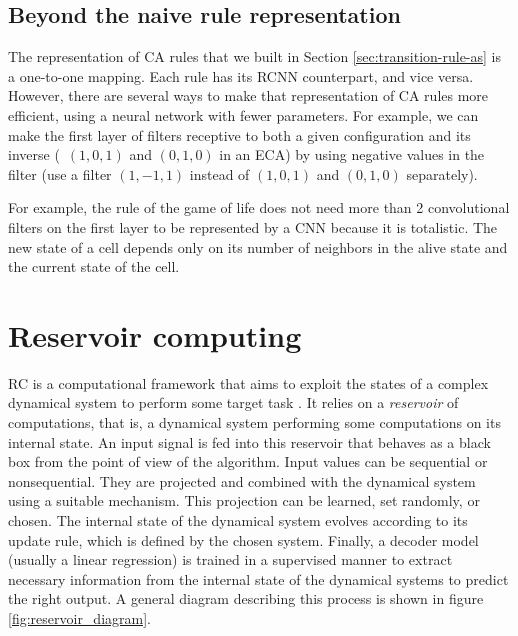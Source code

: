 \subsection{Beyond the naive rule representation}

The representation of \ac{CA} rules that we built in Section
\ref{sec:transition-rule-as} is a one-to-one mapping. Each rule has its
R\ac{CNN} counterpart, and vice versa. However, there are several ways to make
that representation of \ac{CA} rules more efficient, using a neural network with
fewer parameters. For example, we can make the first layer of filters receptive
to both a given configuration and its inverse (\eg~$(1, 0, 1)$ and $(0, 1, 0)$
in an \acl{ECA}) by using negative values in the filter (use a filter $(1, -1, 1)$
instead of $(1, 0, 1)$ and $(0, 1, 0)$ separately).

For example, the rule of the game of life does not need more than 2 convolutional
filters on the first layer to be represented by a \ac{CNN} because it is
totalistic. The new state of a cell depends only on its number of neighbors in
the alive state and the current state of the cell.


\section{Reservoir computing \label{sec:res-models}}
\Acf{RC} is a computational framework that aims to exploit the states of a
complex dynamical system to perform some target task
\parencite{tanakaRecentAdvancesPhysical2019}. It relies on a \emph{reservoir} of
computations, that is, a dynamical system performing some computations on its
internal state. An input signal is fed into this reservoir that behaves as a
black box from the point of view of the algorithm. Input values can be
sequential or nonsequential. They are projected and combined with the dynamical
system using a suitable mechanism. This projection can be learned, set randomly,
or chosen. The internal state of the dynamical system evolves according to its
update rule, which is defined by the chosen system. Finally, a decoder model
(usually a linear regression) is trained in a supervised manner to extract
necessary information from the internal state of the dynamical systems to
predict the right output. A general diagram describing this process is shown in
figure \ref{fig:reservoir_diagram}.


